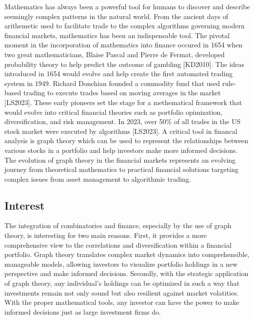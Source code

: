 \documentclass{article}
\begin{document}
Mathematics has always been a powerful tool for humans to discover and describe seemingly complex patterns in the natural world. From the ancient days of arithemetic used to facilitate trade to the complex algorithms governing modern financial markets, mathematics has been an indispensable tool. The pivotal moment in the incorporation of mathematics into finance occured in 1654 when two great mathematicians, Blaise Pascal and Pierre de Fermat, developed probability theory to help predict the outcome of gambling [KD2010]. The ideas introduced in 1654 would evolve and help create the first automated trading system in 1949. Richard Donchian founded a commodity fund that used rule-based trading to execute trades based on moving averages in the market [LS2023]. These early pioneers set the stage for a methematical framework that would evolve into critical financial theories such as portfolio opimization, diversification, and risk management. In 2023, over 50\% of all trades in the US stock market were executed by algorithms [LS2023]. A critical tool in financal analysis is graph theory which can be used to represent the relationships between various stocks in a portfolio and help investors make more informed decisions. The evolution of graph theory in the financial markets represents an evolving journey from theoretical mathematics to practical financial solutions targeting complex issues from asset management to algorithmic trading.


\subsection{Interest}

The integration of combinatorics and finance, especially by the use of graph theory, is interesting for two main reasons. First, it provides a more comprehensive view to the correlations and diversification within a financial portfolio. Graph theory translates complex market dynamics into comprehensible, manageable models, allowing investors to visualize portfolio holdings in a new perspective and make informed decisions. Secondly, with the strategic application of graph theory, any individual's holdings can be optimized in such a way that investments remain not only sound but also resilient against market volatities. With the proper mathematical tools, any investor can have the power to make informed decisions just as large investment firms do.
\end{document}
